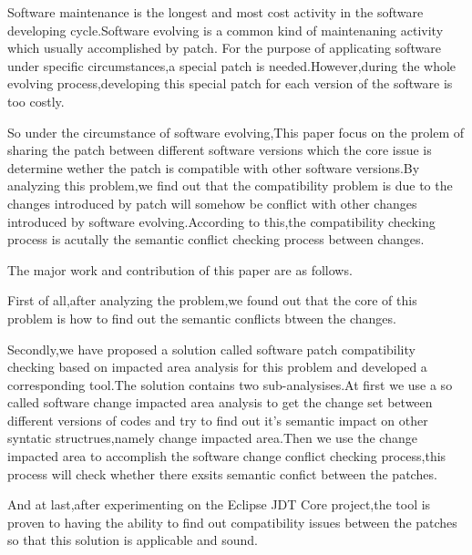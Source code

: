 \begin{eabstract} 
		Software maintenance is the longest and most cost activity in the software developing cycle.Software evolving is a common kind of maintenaning activity which usually accomplished by patch. For the purpose of applicating software under specific circumstances,a special patch is needed.However,during the whole evolving process,developing this special patch for each version of the software is too costly.
		
		So under the circumstance of software evolving,This paper focus on the prolem of sharing the patch between different software versions which the core issue is determine wether the patch is compatible with other software versions.By analyzing this problem,we find out that the compatibility problem is due to the changes introduced by patch will somehow be conflict with other changes introduced by software evolving.According to this,the compatibility checking process is acutally the semantic conflict checking process between changes.
		
		The major work and contribution of this paper are as follows.
		
		First of all,after analyzing the problem,we found out that the core of this problem is how to find out the semantic conflicts btween the changes.
		
		Secondly,we have proposed a solution called software patch compatibility checking based on impacted area analysis for this problem and developed a corresponding tool.The solution contains two sub-analysises.At first we use a so called software change impacted area analysis to get the change set between different versions of codes and try to find out it's semantic impact on other syntatic structrues,namely change impacted area.Then we use the change impacted area to accomplish the software change conflict checking process,this process will check whether there exsits semantic confict between the patches.
		
		And at last,after experimenting on the Eclipse JDT Core project,the tool is proven to having the ability to find out compatibility issues between the patches so that this solution is applicable and sound.
		
		

\end{eabstract}
